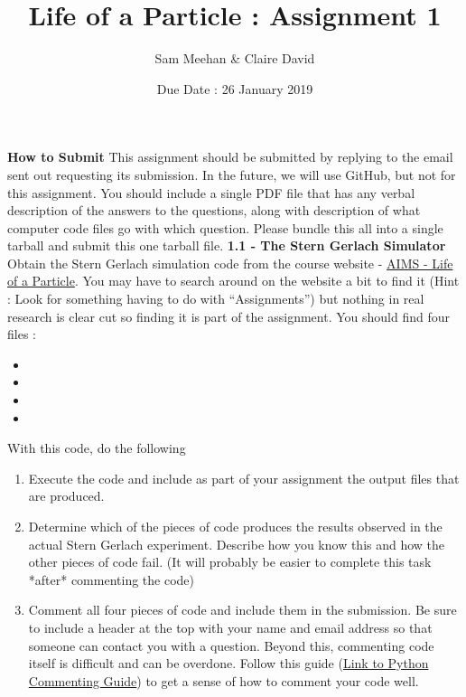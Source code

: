 \documentclass[12pt]{article}
\title{Life of a Particle : Assignment 1}
\author{Sam Meehan \& Claire David}
\date{Due Date : 26 January 2019}
\begin{document}
\maketitle

\textbf{How to Submit}
\newline
This assignment should be submitted by replying to the email sent out requesting its submission.  In the future, we will use GitHub, but not for this assignment.  You should include a single PDF file that has any verbal description of the answers to the questions, along with description of what computer code files go with which question.  Please bundle this all into a single tarball and submit this one tarball file.  
\newline
\newline
\textbf{1.1 - The Stern Gerlach Simulator} 
\newline
Obtain the Stern Gerlach simulation code from the course website - \href{https://sites.google.com/a/aims.edu.gh/the-life-of-a-particle/home}{AIMS - Life of a Particle}.  You may have to search around on the website a bit to find it (Hint : Look for something having to do with ``Assignments'') but nothing in real research is clear cut so finding it is part of the assignment.  You should find four files :
\begin{itemize}[noitemsep]
\item \small{}
\item \small{}
\item \small{}
\item \small{}
\end{itemize}
With this code, do the following
\begin{enumerate}
\item Execute the code and include as part of your assignment the output \small{} files that are produced.
\item Determine which of the pieces of code produces the results observed in the actual Stern Gerlach experiment. Describe how you know this and how the other pieces of code fail. (It will probably be easier to complete this task *after* commenting the code)
\item Comment all four pieces of code and include them in the submission.  Be sure to include a header at the top with your name and email address so that someone can contact you with a question.  Beyond this, commenting code itself is difficult and can be overdone.  Follow this guide (\href{https://www.digitalocean.com/community/tutorials/how-to-write-comments-in-python-3}{Link to Python Commenting Guide}) to get a sense of how to comment your code well.
\end{enumerate}
\end{document}
